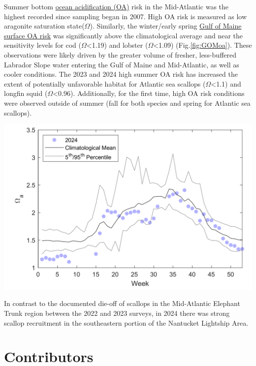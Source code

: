 \documentclass[
  10pt,
]{article}
\let\origfigure\figure
\let\endorigfigure\endfigure
\renewenvironment{figure}[1][2] {
    \expandafter\origfigure\expandafter[H]
} {
    \endorigfigure
}
\begin{document}
Summer bottom \href{https://noaa-edab.github.io/catalog/ocean_acidification.html}{ocean acidification (OA)} risk in the Mid-Atlantic was the highest recorded since sampling began in 2007. High OA risk is measured as low aragonite saturation state(\(\Omega\)). Similarly, the winter/early spring \href{https://noaa-edab.github.io/catalog/gom_acidification.html}{Gulf of Maine surface OA risk} was significantly above the climatological average and near the sensitivity levels for cod (\(\Omega\)\textless1.19) and lobster (\(\Omega\)\textless1.09) (Fig.\ref{fig:GOMoa}). These observations were likely driven by the greater volume of fresher, less-buffered Labrador Slope water entering the Gulf of Maine and Mid-Atlantic, as well as cooler conditions. The 2023 and 2024 high summer OA risk has increased the extent of potentially unfavorable habitat for Atlantic sea scallops (\(\Omega\)\textless1.1) and longfin squid (\(\Omega\)\textless0.96). Additionally, for the first time, high OA risk conditions were observed outside of summer (fall for both species and spring for Atlantic sea scallops).

\begin{figure}

{\centering \includegraphics[width=0.6\linewidth]{midatlantic_files/figure-latex/GOMoa-1} 

}

\caption{Weekly average surface aragonite saturation state measured at the long-term buoy location in the Gulf of Maine at 43.02 N and 70.54 W}\label{fig:GOMoa}
\end{figure}

In contrast to the documented die-off of scallops in the Mid-Atlantic Elephant Trunk region between the 2022 and 2023 surveys, in 2024 there was strong scallop recruitment in the southeastern portion of the Nantucket Lightship Area.

\section{Contributors}\label{contributors}
\end{document}
